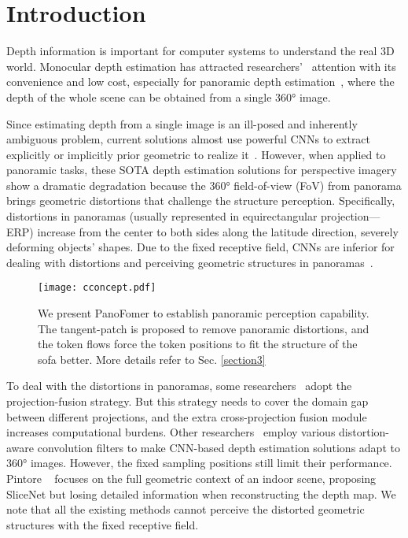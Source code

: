 \documentclass[runningheads]{llncs}
\begin{document}
\section{Introduction}

Depth information is important for computer systems to understand the real 3D world. Monocular depth estimation has attracted researchers'~\cite{Cheng2018Cube,cheng2020omnidirectional,cohen2018spherical,esteves2018learning,yan2021rignet,yan2022multi} attention with its convenience and low cost, especially for panoramic depth estimation~\cite{yu2017flat2sphere,yun2022improving,wang2020bifuse}, where the depth of the whole scene can be obtained from a single 360° image.

 Since estimating depth from a single image is an ill-posed and inherently ambiguous problem, current solutions almost use powerful CNNs to extract explicitly or implicitly prior geometric to realize it~\cite{bhoi2019monocular,chen2021distortion}. However, when applied to panoramic tasks, these SOTA depth estimation solutions for perspective imagery~\cite{laina2016deeper} show a dramatic degradation because the 360° field-of-view (FoV) from panorama brings geometric distortions that challenge the structure perception. Specifically, distortions in panoramas (usually represented in equirectangular projection---ERP) increase from the center to both sides along the latitude direction, severely deforming objects' shapes. Due to the fixed receptive field, CNNs are 
inferior for dealing with distortions and perceiving geometric structures in panoramas~\cite{chen2021distortion}.
\begin{figure}[t]
  \centering
  \texttt{[image: cconcept.pdf]} \caption{We present PanoFomer to establish panoramic perception capability. The tangent-patch is proposed to remove panoramic distortions, and the token flows force the token positions to fit the structure of the sofa better.
  More details refer to Sec. \ref{section3}} \label{fig:motivation}
\end{figure}
 To deal with the distortions in panoramas, some researchers~\cite{jiang2021unifuse,shen2021distortion,song2017semantic,wang2020bifuse} adopt the projection-fusion strategy. But this strategy needs to cover the domain gap between different projections, and the extra cross-projection fusion module increases computational burdens. Other researchers~\cite{coors2018spherenet,dai2017deformable,eigen2014depth,su2019kernel,zhu2020deformable,su2019kernel,xiong2018snap,xu2021spherical,jiang2019spherical,khasanova2019geometry,lee2019spherephd} employ various distortion-aware convolution filters to make CNN-based depth estimation solutions adapt to 360° images. However, the fixed sampling positions still limit their performance. Pintore ~\cite{pintore2021slicenet} focuses on the full geometric context of an indoor scene, proposing SliceNet but losing detailed information when reconstructing the depth map. We note that all the existing methods cannot perceive the distorted geometric structures with the fixed receptive field.
\end{document}

